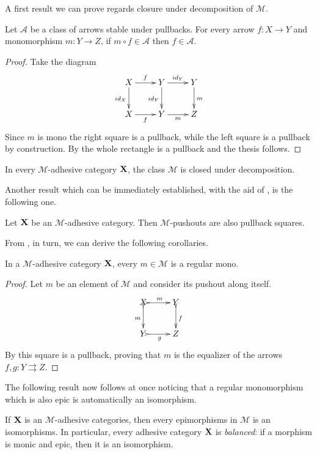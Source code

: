 \documentclass[a4paper,UKenglish,cleveref,pdftex, thm-restate,numberwithinsect]{lipics}
\newcommand{\id}[1]{\mathsf{id}_{#1}}
\def\X{\textbf {\textup{X}}}
\def\Y{\textbf {\textup{Y}}}
\begin{document}
A first result we can prove regards closure under decomposition of $\mathcal{M}$.

\begin{proposition}\label{prop:deco}Let  $\mathcal{A}$ be a class of arrows stable under pullbacks. For every arrow $f\colon X\to Y$ and monomorphism $m\colon Y\to Z$, if $m\circ f \in\mathcal{A}$ then $f\in \mathcal{A}$.
\end{proposition}
\begin{proof}Take the diagram
	\[\xymatrix{X \ar[d]_{\id{X}}\ar[r]^{f}& Y \ar[r]^{\id{Y}}  \ar[d]_{\id{Y}}& Y \ar[d]^{m}\\
		X \ar[r]_{f}& Y \ar[r]_{m} & Z}\]
	Since $m$ is mono the right square is a pullback, while the left square is a pullback by construction. By  the whole rectangle is a pullback and the thesis follows.
\end{proof}
\begin{corollary}\label{cor:deco}
	In every $\mathcal{M}$-adhesive category $\X$, the class $\mathcal{M}$ is closed under decomposition.
\end{corollary}

Another result which can be immediately established, with the aid of , is the following one.
\begin{proposition}\label{prop:pbpoad}
	Let $\X$ be an $\mathcal{M}$-adhesive category. Then $\mathcal{M}$-pushouts are also pullback squares.
\end{proposition}

From , in turn, we can derive the following corollaries.
\begin{corollary}\label{cor:rego}
	In a $\mathcal{M}$-adhesive category $\X$, every $m\in\mathcal{M}$ is a regular mono.
\end{corollary}
\begin{proof}
Let $m$ be an element of $\mathcal{M}$ and consider its pushout along itself.
\[\xymatrix{X\ar@{>->}[r]^m \ar@{>->}[d]_m& Y\ar@{>->}[d]^{f}\\Y \ar@{>->}[r]_g & Z}\]
By  this square is a pullback, proving that $m$ is the equalizer of the arrows $f,g\colon Y\rightrightarrows Z$. \qedhere 
\end{proof}

The following result now follows at once noticing that a regular monomorphism which is also epic is automatically an isomorphism.

\begin{corollary}\label{prop:bal}
If $\X$ is an $\mathcal{M}$-adhesive categories, then every epimorphisms in $\mathcal{M}$ is an isomorphisms. In particular, every adhesive category $\X$ is \emph{balanced}: if a morphism is monic and epic, then it is an isomorphism.
\end{corollary}
\end{document}
